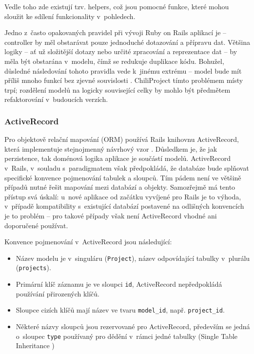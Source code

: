 \documentclass[thesis=B,czech]{FITthesis}[2012/05/02]
\begin{document}
Vedle toho zde existují tzv. helpers, což jsou pomocné funkce, které
mohou sloužit ke sdílení funkcionality v~pohledech.

Jedno z~často opakovaných pravidel při vývoji Ruby on Rails aplikací je
\citep{Buck2006} -- controller by měl
obstarávat pouze jednoduché dotazování a přípravu dat. Většina logiky --
ať už složitější dotazy nebo určité zpracování a reprezentace dat -- by
měla být obstarána v~modelu, čímž se redukuje duplikace kódu. Bohužel,
důsledné následování tohoto pravidla vede k~jinému extrému -- model bude mít
příliš mnoho funkcí bez zjevné souvislosti \citep{Libbery2011}.
ChiliProject tímto problémem místy trpí; rozdělení modelů na logicky
související celky \citep{Grimm2012} by mohlo být předmětem refaktorování
v~budoucích verzích.

\subsubsection{ActiveRecord}

Pro objektově relační mapování (ORM) používá Rails knihovnu
ActiveRecord, která implementuje stejnojmenný návrhový vzor \citep[str.
160]{Fowler2003}. Důsledkem je, že jak perzistence, tak doménová logika
aplikace je součástí modelů. ActiveRecord v~Rails, v~souladu
s~paradigmatem  však předpokládá, že
databáze bude splňovat specifické konvence pojmenování tabulek a
sloupců. Tím pádem není ve většině případů nutné řešit mapování mezi
databází a objekty. Samozřejmě má tento přístup svá úskalí: u~nové
aplikace od začátku vyvíjené pro Rails je to výhoda, v~případě
kompatibility s~existující databází postavené na odlišných konvencích je
to problém -- pro takové případy však není ActiveRecord vhodné ani
doporučené používat.

Konvence pojmenování v~ActiveRecord jsou následující:
\begin{itemize}
\item Název modelu je v~singuláru (\lstinline!Project!), název odpovídající tabulky
v~plurálu (\lstinline!projects!).
\item Primární klíč záznamu je ve sloupci \lstinline!id!, ActiveRecord nepředpokládá používání přirozených
klíčů.
\item Sloupce cizích klíčů mají název ve tvaru \lstinline!model_id!,
např. \lstinline!project_id!.
\item Některé názvy sloupců jsou rezervované pro ActiveRecord, především se jedná o~sloupec \lstinline!type!
používaný pro dědění v~rámci jedné tabulky (Single Table Inheritance
\citep[str. 278]{Fowler2003})
\end{itemize}
\end{document}
